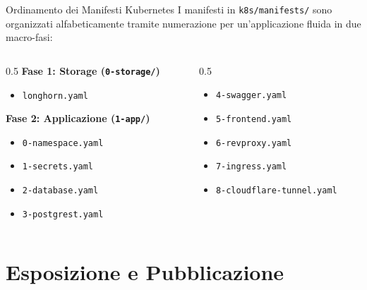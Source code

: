 \documentclass[aspectratio=169]{beamer}
\begin{document}
\begin{frame}{Ordinamento dei Manifesti Kubernetes}
    I manifesti in \texttt{k8s/manifests/} sono organizzati alfabeticamente tramite numerazione per un'applicazione fluida in due macro-fasi:
    
    \begin{columns}
        \begin{column}{0.5\textwidth}
            \textbf{Fase 1: Storage (\texttt{0-storage/})}
            \begin{itemize}
                \item \texttt{longhorn.yaml}
            \end{itemize}
            \textbf{Fase 2: Applicazione (\texttt{1-app/})}
            \begin{itemize}
                \item \texttt{0-namespace.yaml}
                \item \texttt{1-secrets.yaml}
                \item \texttt{2-database.yaml}
                \item \texttt{3-postgrest.yaml}
            \end{itemize}
        \end{column}
        \begin{column}{0.5\textwidth}
            \begin{itemize}
                \item \texttt{4-swagger.yaml}
                \item \texttt{5-frontend.yaml}
                \item \texttt{6-revproxy.yaml}
                \item \texttt{7-ingress.yaml}
                \item \texttt{8-cloudflare-tunnel.yaml}
            \end{itemize}
        \end{column}
    \end{columns}
\end{frame}

\section{Esposizione e Pubblicazione}
\end{document}
